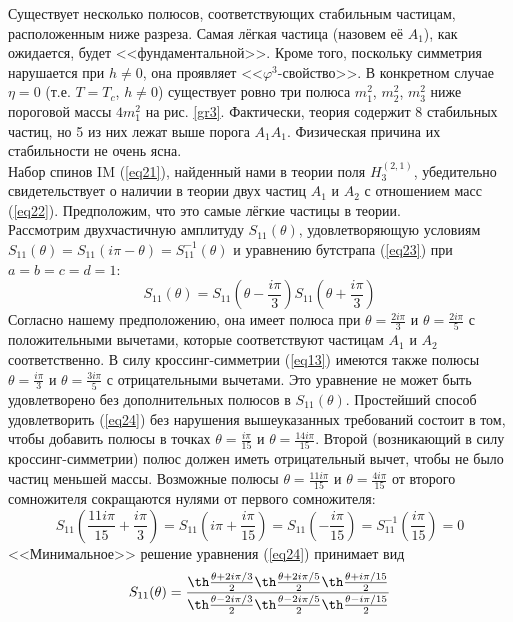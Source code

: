 \documentclass[12pt]{article}
\theoremstyle{definition}
\begin{document}
Существует несколько полюсов, соответствующих стабильным частицам, расположенным ниже разреза. Самая лёгкая частица (назовем её $A_1$), как ожидается, будет <<фундаментальной>>. Кроме того, поскольку симметрия нарушается при $h\neq0$, она проявляет <<$\varphi^3$-свойство>>. В конкретном случае $\eta=0$ (т.е. $T=T_c$, $h \neq 0$) существует ровно три полюса $m_1^2$, $m_2^2$, $m_3^2$ ниже пороговой массы $4m_1^2$ на рис. \ref{gr3}. Фактически, теория содержит 8 стабильных частиц, но 5 из них лежат выше порога $A_1A_1$. Физическая причина их стабильности не очень ясна.\\
Набор спинов IM (\ref{eq21}), найденный нами в теории поля $H^{(2,1)}_3$, убедительно свидетельствует о наличии в теории двух частиц $A_1$ и $A_2$ с отношением масс (\ref{eq22}). Предположим, что это самые лёгкие частицы в теории.\\
Рассмотрим двухчастичную амплитуду $S_{11}(\theta)$, удовлетворяющую условиям $S_{11}(\theta)=S_{11}(i\pi-\theta)=S_{11}^{-1}(\theta)$ и уравнению бутстрапа (\ref{eq23}) при $a = b = c = d = 1$:
\begin{equation}\label{eq24}
    S_{11}(\theta)=S_{11}\left(\theta-\frac{i\pi}{3}\right)S_{11}\left(\theta+\frac{i\pi}{3}\right)
\end{equation}
Согласно нашему предположению, она имеет полюса при $\theta=\frac{2i\pi}{3}$ и $\theta=\frac{2i\pi}{5}$ с положительными вычетами, которые соответствуют частицам $A_1$ и $A_2$ соответственно. В силу кроссинг-симметрии (\ref{eq13}) имеются также полюсы $\theta = \frac{i\pi}{3}$ и $\theta=\frac{3i\pi}{5}$ с отрицательными вычетами. 
Это уравнение не может быть удовлетворено без дополнительных полюсов в $S_{11}(\theta)$. Простейший способ удовлетворить (\ref{eq24}) без нарушения вышеуказанных требований состоит в том, чтобы добавить полюсы в точках $\theta=\frac{i\pi}{15}$ и $\theta=\frac{14i\pi}{15}$. Второй (возникающий в силу кроссинг-симметрии) полюс должен иметь отрицательный вычет, чтобы не было частиц меньшей массы. Возможные полюсы $\theta=\frac{11i\pi}{15}$ и $\theta=\frac{4i\pi}{15}$ от второго сомножителя сокращаются нулями от первого сомножителя:
\begin{equation}
    S_{11}\left(\frac{11i\pi}{15}+\frac{i\pi}{3}\right)=S_{11}\left(i\pi+\frac{i\pi}{15}\right)=S_{11}\left(-\frac{i\pi}{15}\right)=S^{-1}_{11}\left(\frac{i\pi}{15}\right)=0
\end{equation}
<<Минимальное>> решение уравнения (\ref{eq24}) принимает вид
\begin{equation}
    S_{11}(\theta)=\frac{\th\frac{\theta+2i\pi/3}{2}\th\frac{\theta+2i\pi/5}{2}\th\frac{\theta+i\pi/15}{2}}{\th\frac{\theta-2i\pi/3}{2}\th\frac{\theta-2i\pi/5}{2}\th\frac{\theta-i\pi/15}{2}}
\end{equation}
\end{document}
